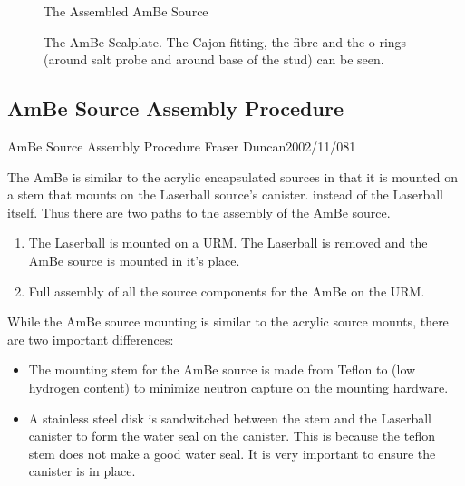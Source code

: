 \begin{figure}[t]
\begin{center}
\leavevmode
\epsfxsize=5.0in
\caption[AmBe Source Assembled]{
  }
  The Assembled AmBe Source
\end{center}
\end{figure}
\begin{figure}[b]
\begin{center}
\leavevmode
\epsfxsize=5.0in
\caption[AmBe Source Sealplate]{
  }
  The AmBe Sealplate.  The Cajon fitting, the fibre and
  the o-rings (around salt probe and around base of the stud)
  can be seen.
\end{center}
\end{figure}



\clearpage

\subsection{AmBe Source Assembly Procedure}
             {AmBe Source Assembly Procedure}
             {Fraser Duncan}{2002/11/08}{1}

  The AmBe is similar to the acrylic encapsulated sources in that
it is mounted on a stem that mounts on the Laserball source's canister.
instead of the Laserball itself.  Thus there are two paths to
the assembly of the AmBe source.  
\begin{enumerate}
\item The Laserball is mounted on a URM.  The Laserball is removed and
  the AmBe source is mounted in it's place.
\item Full assembly of all the source components for the AmBe on the
  URM.
\end{enumerate}
While the AmBe source mounting is similar to the acrylic source mounts,
there are two important differences:
\begin{itemize}
\item The mounting stem for the AmBe source is made from Teflon to
  (low hydrogen content) to minimize neutron capture on the mounting
   hardware.
\item A stainless steel disk is sandwitched between the stem and the
  Laserball canister to form the water seal on the canister. This is
  because the teflon stem does not make a good water seal.  It is
  very important to ensure the canister is in place.
\end{itemize}



